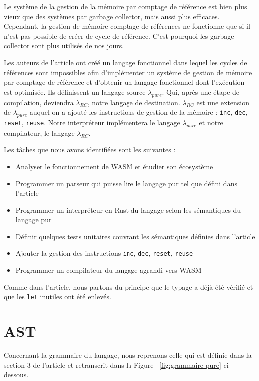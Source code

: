 \documentclass{rapportECL}
\begin{document}
Le système de la gestion de la mémoire par comptage de référence est bien plus vieux que des systèmes par garbage collector, 
mais aussi plus efficaces\cite{ullrich_counting_2020}. Cependant, la gestion de mémoire comptage de références ne fonctionne que si 
il n'est pas possible de créer de cycle de référence. 
C'est pourquoi les garbage collector sont plus utilisés de nos jours.

Les auteurs de l'article\cite{ullrich_counting_2020} ont créé un langage fonctionnel dans lequel les cycles de références 
sont impossibles afin d'implémenter un système de gestion de mémoire par comptage de référence et d'obtenir un langage fonctionnel 
dont l'exécution est optimisée. Ils définissent un langage source $\lambda_{pure}$. 
Qui, après une étape de compilation, deviendra $\lambda_{RC}$, notre langage de destination.
$\lambda_{RC}$ est une extension de $\lambda_{pure}$ auquel on a ajouté les instructions de gestion de la mémoire : 
\verb|inc|, \verb|dec|, \verb|reset|, \verb|reuse|.
Notre interpréteur implémentera le langage $\lambda_{pure}$ et notre compilateur, le langage $\lambda_{RC}$.


Les tâches que nous avons identifiées sont les suivantes :

\begin{itemize}
	\item Analyser le fonctionnement de WASM et étudier son écosystème
	\item Programmer un parseur qui puisse lire le langage pur tel que défini dans l'article\cite{ullrich_counting_2020}
	\item Programmer un interpréteur en Rust du langage selon les sémantiques du langage pur
	\item Définir quelques tests unitaires couvrant les sémantiques définies dans l'article
	\item Ajouter la gestion des instructions \verb|inc|, \verb|dec|, \verb|reset|, \verb|reuse|
	\item Programmer un compilateur du langage agrandi vers WASM
\end{itemize}

Comme dans l'article, nous partons du principe que le typage a déjà été vérifié et que les \verb|let| inutiles ont été enlevés.

\section{AST}

Concernant la grammaire du langage, nous reprenons celle qui est définie dans la section 3 de l'article et retranscrit dans la Figure ~\ref{fig:grammaire pure} ci-dessous.
\end{document}
